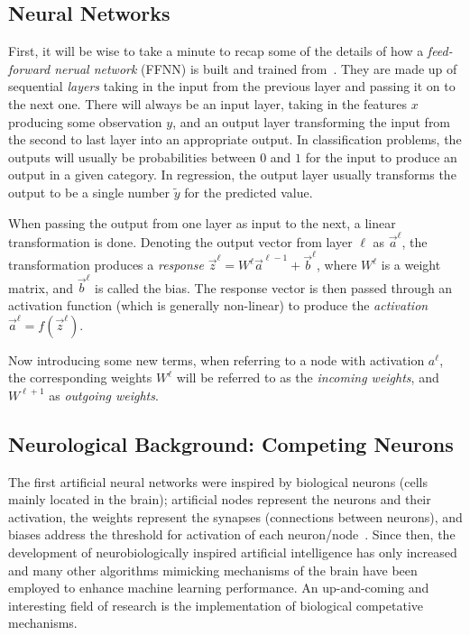      

\subsection{Neural Networks}
    First, it will be wise to take a minute to recap some of the details of how a \textit{feed-forward nerual network} (FFNN) is built and trained from~\cite{Project2}. They are made up of sequential \textit{layers} taking in the input from the previous layer and passing it on to the next one. There will always be an input layer, taking in the features $x$ producing some observation $y$, and an output layer transforming the input from the second to last layer into an appropriate output. In classification problems, the outputs will usually be probabilities between $0$ and $1$ for the input to produce an output in a given category. In regression, the output layer usually transforms the output to be a single number $\tilde{y}$ for the predicted value.

    When passing the output from one layer as input to the next, a linear transformation is done. Denoting the output vector from layer $\ell$ as $\vec{a}^\ell$, the transformation produces a \textit{response} $\vec{z}^{\ell} = W^\ell \vec{a}^{\ell-1} + \vec{b}^\ell$, where $W^\ell$ is a weight matrix, and $\vec{b}^\ell$ is called the bias. The response vector is then passed through an activation function (which is generally non-linear) to produce the \textit{activation} $\vec{a}^\ell = f(\vec{z}^\ell)$.

    Now introducing some new terms, when referring to a node with activation $a^\ell$, the corresponding weights $W^\ell$ will be referred to as the \textit{incoming weights}, and $W^{\ell + 1}$ as \textit{outgoing weights}.

\subsection{Neurological Background: Competing Neurons}
    The first artificial neural networks were inspired by biological neurons (cells mainly located in the brain); artificial nodes represent the neurons and their activation, the weights represent the synapses (connections between neurons), and biases address the threshold for activation of each neuron/node~\citep{Project2}. Since then, the development of neurobiologically inspired artificial intelligence has only increased and many other algorithms mimicking mechanisms of the brain have been employed to enhance machine learning performance. An up-and-coming and interesting field of research is the implementation of biological competative mechanisms. 
    
